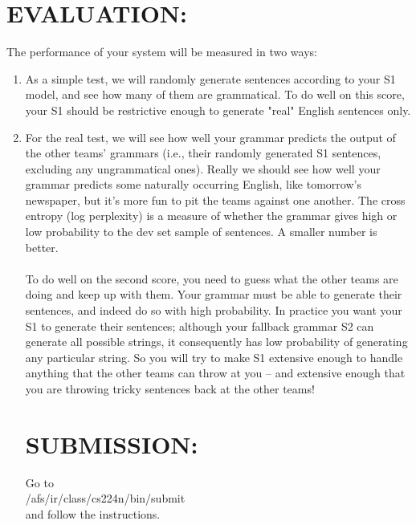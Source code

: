 \documentclass[11pt]{article}
\begin{document}
\section{EVALUATION:}
The performance of your system will be measured in two ways:
\begin{enumerate}
\item As a simple test, we will randomly generate sentences according to your S1 model, and see how many of them are grammatical. To do well on this score, your S1 should be restrictive enough to generate "real" English sentences only.
\item For the real test, we will see how well your grammar predicts the output of the other teams' grammars (i.e., their randomly generated S1 sentences, excluding any ungrammatical ones). Really we should see how well your grammar predicts some naturally occurring English, like tomorrow's newspaper, but it's more fun to pit the teams against one another. The cross entropy (log perplexity) is a measure of whether the grammar gives high or low probability to the dev set sample of sentences. A smaller number is better.\\ \\
To do well on the second score, you need to guess what the other teams are doing and keep up with them. Your grammar must be able to generate their sentences, and indeed do so with high probability. In practice you want your S1 to generate their sentences; although your fallback grammar S2 can generate all possible strings, it consequently has low probability of generating any particular string. So you will try to make S1 extensive enough to handle anything that the other teams can throw at you -- and extensive enough that you are throwing tricky sentences back at the other teams! 


\section{SUBMISSION:}
Go to \\
/afs/ir/class/cs224n/bin/submit \\
and follow the instructions.

\end{enumerate}
\end{document}

